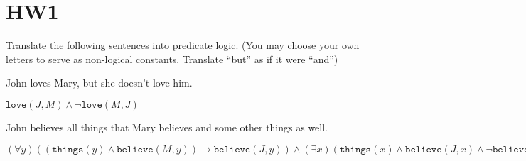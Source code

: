 \section{HW1}
Translate the following sentences into predicate logic. 	
(You may choose your own letters to serve as non-logical constants. Translate ``but'' as if it were ``and'')
\begin{QandA}
   \item John loves Mary, but she doesn’t love him. 
         \begin{answered}
		 $\texttt{love}(J,M) \land \neg \texttt{love}(M,J)$
         \end{answered}

   \item John believes all things that Mary believes and some other things as well.
         \begin{answered}
         $(\forall y)((\texttt{things}(y) \land \texttt{believe}(M,y)) \rightarrow \texttt{believe}(J,y)) \land (\exists x)(\texttt{things}(x)
         \land \texttt{believe}(J,x) \land \neg \texttt{believe}(M,x))$
         \end{answered}
         

\end{QandA}
